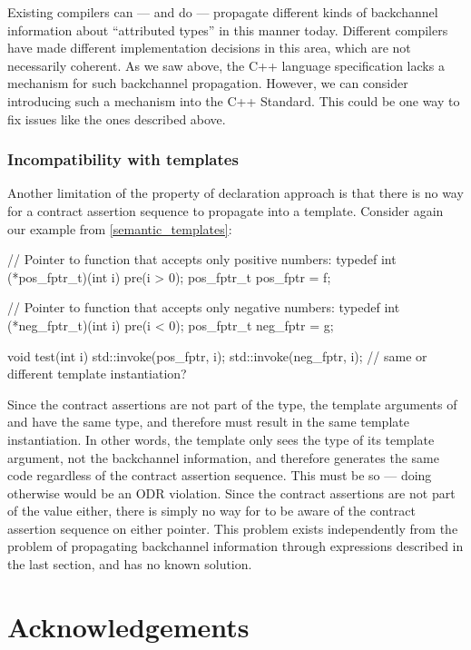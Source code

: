 Existing compilers can --- and do --- propagate different kinds of backchannel information about ``attributed types'' in this manner today. Different compilers have made different implementation decisions in this area, which are not necessarily coherent. As we saw above, the C++ language specification lacks a mechanism for such backchannel propagation. However, we can consider introducing such a mechanism into the C++ Standard. This could be one way to fix issues like the ones described above.

\subsubsection{Incompatibility with templates}

Another limitation of the property of declaration approach is that there is no way for a contract assertion sequence to propagate into a template. Consider again our example from \ref{semantic_templates}:
\begin{codeblock}
// Pointer to function that accepts only positive numbers:
typedef int (*pos_fptr_t)(int i) pre(i > 0);
pos_fptr_t pos_fptr = f;

// Pointer to function that accepts only negative numbers:
typedef int (*neg_fptr_t)(int i) pre(i < 0);
pos_fptr_t neg_fptr = g;

void test(int i) {
  std::invoke(pos_fptr, i);
  std::invoke(neg_fptr, i);  // same or different template instantiation?
}
\end{codeblock}
Since the contract assertions are not part of the type, the template arguments of  and  have the same type, and therefore must result in the same template instantiation. In other words, the template only sees the type of its template argument, not the backchannel information, and therefore generates the same code regardless of the contract assertion sequence. This must be so --- doing otherwise would be an ODR violation. Since the contract assertions are not part of the value either, there is simply no way for  to be aware of the contract assertion sequence on either pointer. This problem exists independently from the problem of propagating backchannel information through expressions described in the last section, and has no known solution.


\section*{Acknowledgements}

